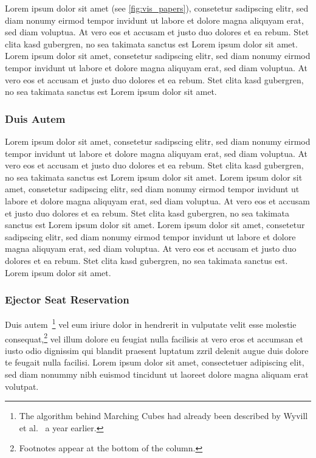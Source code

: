 \documentclass[journal]{vgtc}                %
\begin{document}
Lorem ipsum dolor sit amet (see \cref{fig:vis_papers}), consetetur sadipscing elitr, sed diam nonumy eirmod tempor invidunt ut labore et dolore magna aliquyam erat, sed diam voluptua.
At vero eos et accusam et justo duo dolores et ea rebum.
Stet clita kasd gubergren, no sea takimata sanctus est Lorem ipsum dolor sit amet.
Lorem ipsum dolor sit amet, consetetur sadipscing elitr, sed diam nonumy eirmod tempor invidunt ut labore et dolore magna aliquyam erat, sed diam voluptua.
At vero eos et accusam et justo duo dolores et ea rebum.
Stet clita kasd gubergren, no sea takimata sanctus est Lorem ipsum dolor sit amet.


\subsubsection{Duis Autem}

Lorem ipsum dolor sit amet, consetetur sadipscing elitr, sed diam nonumy eirmod tempor invidunt ut labore et dolore magna aliquyam erat, sed diam voluptua.
At vero eos et accusam et justo duo dolores et ea rebum.
Stet clita kasd gubergren, no sea takimata sanctus est Lorem ipsum dolor sit amet.
Lorem ipsum dolor sit amet, consetetur sadipscing elitr, sed diam nonumy eirmod tempor invidunt ut labore et
dolore magna aliquyam erat, sed diam voluptua.
At vero eos et accusam et justo duo dolores et ea rebum.
Stet clita kasd gubergren, no sea takimata sanctus est Lorem ipsum dolor sit amet.
Lorem ipsum dolor sit amet, consetetur sadipscing elitr, sed diam nonumy eirmod tempor invidunt ut labore et dolore magna aliquyam erat, sed diam
voluptua.
At vero eos et accusam et justo duo dolores et ea rebum.
Stet clita kasd gubergren, no sea takimata sanctus est.
Lorem ipsum dolor sit amet.




\subsubsection{Ejector Seat Reservation}

Duis autem~\cite{Lorensen:1987:MCA}\footnote{The algorithm behind Marching Cubes \cite{Lorensen:1987:MCA} had already been described by Wyvill et al.\ \cite{Wyvill:1986:DSS} a year earlier.} 
vel eum iriure dolor in hendrerit in vulputate velit esse molestie consequat,\footnote{Footnotes appear at the bottom of the column.}
vel illum dolore eu feugiat nulla facilisis at vero eros et accumsan et iusto odio dignissim qui blandit praesent luptatum zzril delenit augue duis dolore te feugait nulla facilisi.
Lorem ipsum dolor sit amet, consectetuer adipiscing elit, sed diam nonummy nibh euismod tincidunt ut laoreet dolore magna aliquam erat volutpat.
\end{document}
